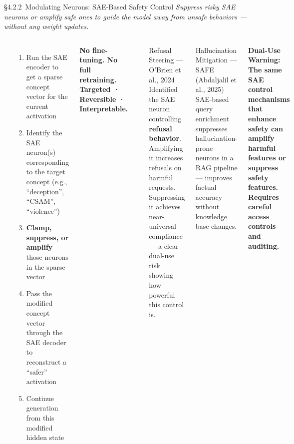 \begin{frame}{\S4.2.2\ Modulating Neurons: SAE-Based Safety Control}
  {\footnotesize\itshape Suppress risky SAE neurons or amplify safe ones to guide the model away from unsafe behaviors --- without any weight updates.}
  \vspace{0.3em}
  \begin{columns}[T]
    {\small\bfseries{}}
    \begin{enumerate}\scriptsize\setlength\itemsep{4pt}
      \item Run the SAE encoder to get a sparse concept vector for the current activation
      \item Identify the SAE neuron(s) corresponding to the target concept (e.g., ``deception'', ``CSAM'', ``violence'')
      \item \textbf{Clamp, suppress, or amplify} those neurons in the sparse vector
      \item Pass the modified concept vector through the SAE decoder to reconstruct a ``safer'' activation
      \item Continue generation from this modified hidden state
    \end{enumerate}
    \vspace{0.3em}
    \begin{ucrdark}[UCRnavy]
      \centering\scriptsize\bfseries
      No fine-tuning. No full retraining.\\
      Targeted · Reversible · Interpretable.
    \end{ucrdark}

    {\small\bfseries{}}
    \begin{ucrcard}[UCRnavy]{Refusal Steering --- O'Brien et al., 2024}
      \scriptsize
      Identified the SAE neuron controlling \textbf{refusal behavior}. Amplifying it increases refusals on harmful requests. Suppressing it achieves near-universal compliance --- a clear dual-use risk showing how powerful this control is.
    \end{ucrcard}
    \vspace{0.3em}
    \begin{ucrcard}[UCRnavy]{Hallucination Mitigation --- SAFE (Abdaljalil et al., 2025)}
      \scriptsize
      SAE-based query enrichment suppresses hallucination-prone neurons in a RAG pipeline --- improves factual accuracy without knowledge base changes.
    \end{ucrcard}
    \vspace{0.3em}
    \begin{ucrwarn}
      \scriptsize\bfseries Dual-Use Warning:\\[2pt]
      \normalfont\scriptsize
      The same SAE control mechanisms that enhance safety can amplify harmful features or suppress safety features. Requires careful access controls and auditing.
    \end{ucrwarn}
  \end{columns}
\end{frame}


